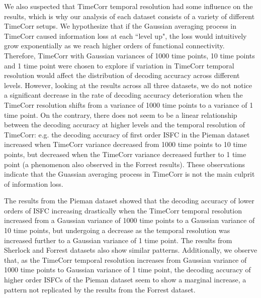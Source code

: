 \documentclass[11pt]{article}
\begin{document}
We also suspected that TimeCorr temporal resolution had some influence on the results, which is why our analysis of each dataset consists of a variety of different TimeCorr setups. We hypothesize that if the Gaussian averaging process in TimeCorr caused information loss at each ``level up", the loss would intuitively grow exponentially as we reach higher orders of functional connectivity. Therefore, TimeCorr with Gaussian variances of 1000 time points, 10 time points and 1 time point were chosen to explore if variation in TimeCorr temporal resolution would affect the distribution of decoding accuracy across different levels. However, looking at the results across all three datasets, we do not notice a significant decrease in the rate of decoding accuracy deterioration when the TimeCorr resolution shifts from a variance of 1000 time points to a variance of 1 time point. On the contrary, there does not seem to be a linear relationship between the decoding accuracy at higher levels and the temporal resolution of TimeCorr: e.g. the decoding accuracy of first order ISFC in the Pieman dataset increased when TimeCorr variance decreased from 1000 time points to 10 time points, but decreased when the TimeCorr variance decreased further to 1 time point (a phenomenon also observed in the Forrest results). These observations indicate that the Guassian averaging process in TimeCorr is not the main culprit of information loss.

The results from the Pieman dataset showed that the decoding accuracy of lower orders of ISFC increasing drastically when the TimeCorr temporal resolution increased from a Gaussian variance of 1000 time points to a Gaussian variance of 10 time points, but undergoing a decrease as the temporal resolution was increased further to a Gaussian variance of 1 time point. The results from Sherlock and Forrest datasets also show similar patterns. Additionally, we observe that, as the TimeCorr temporal resolution increases from Gaussian variance of 1000 time points to Gaussian variance of 1 time point, the decoding accuracy of higher order ISFCs of the Pieman dataset seem to show a marginal increase, a pattern not replicated by the results from the Forrest dataset.
\end{document}
